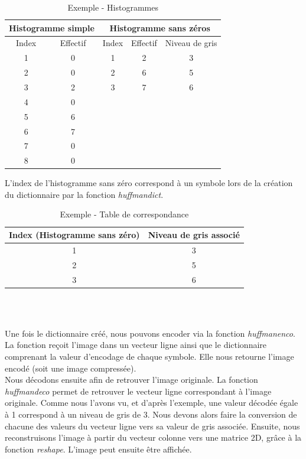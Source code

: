 \documentclass[a4paper, 12pt]{article}
\begin{document}
\begin{table}[!h]
	\centering
		\begin{tabular}{|c c|c c c|}
			\hline 
			\multicolumn{2}{|c|}{Histogramme simple} & \multicolumn{3}{|c|}{ Histogramme sans zéros } \\
			\hline Index & Effectif & Index & Effectif & Niveau de gris\\
			\hline
						1 & 0 & 1  & 2 & 3 \\
						2 & 0 & 2  & 6 & 5\\
						3 & 2 & 3  & 7 & 6\\
						4 & 0 &  & &  \\
						5 & 6 &  & &  \\
						6 & 7 &  & &  \\
						7 & 0 &  & & 	\\
						8 & 0 &  & & 	\\
			\hline
		\end{tabular}
	\caption{Exemple - Histogrammes}
	\label{tab:Histogrammes}
\end{table}

L'index de l'histogramme sans zéro correspond à un symbole lors de la création du dictionnaire par la fonction \textit{huffmandict}. \\

\begin{table}[!h]
	\centering
		\begin{tabular}{|c|c|}
			\hline 
				Index (Histogramme sans zéro) & Niveau de gris associé \\
			\hline 
				1 & 3 \\
				2 & 5 \\
				3 & 6 \\
			\hline
		\end{tabular} \\
	\caption{Exemple - Table de correspondance}
	\label{tab:TableDeCorrespondance}
\end{table}
\\
Une fois le dictionnaire créé, nous pouvons encoder via la fonction \textit{huffmanenco}. La fonction reçoit l'image dans un vecteur ligne ainsi que le dictionnaire comprenant la valeur d'encodage de chaque symbole. Elle nous retourne l'image encodé (soit une image compressée). \\

Nous décodons ensuite afin de retrouver l'image originale. La fonction \textit{huffmandeco} permet de retrouver le vecteur ligne correspondant à l'image originale. Comme nous l'avons vu, et d'après l'exemple, une valeur décodée égale à 1 correspond à un niveau de gris de 3. Nous devons alors faire la conversion de chacune des valeurs du vecteur ligne vers sa valeur de gris associée. Ensuite, nous reconstruisons l'image à partir du vecteur colonne vers une matrice 2D, grâce à la fonction \textit{reshape}. L'image peut ensuite être affichée.\\
\end{document}
